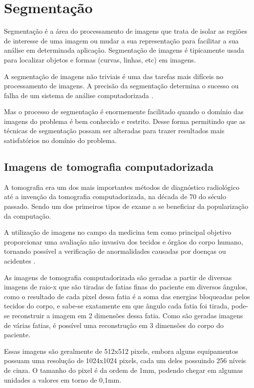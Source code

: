 \chapter{Segmentação}

Segmentação é a área do processamento de imagens que trata de isolar as regiões de interesse de uma imagem ou mudar a sua representação para facilitar a sua análise em determinada aplicação. Segmentação de imagens é tipicamente usada para localizar objetos e formas (curvas, linhas, etc) em imagens.

A segmentação de imagens não triviais é uma das tarefas mais difíceis no processamento de imagens. A precisão da segmentação determina o sucesso ou falha de um sistema de análise computadorizada \cite{gonzalez}.

Mas o processo de segmentação é enormemente facilitado quando o domínio das imagens do problema é bem conhecido e restrito. Desse forma permitindo que as técnicas de segmentação possam ser alteradas para trazer resultados mais satisfatórios no domínio do problema.

\section{Imagens de tomografia computadorizada}

A tomografia era um dos mais importantes métodos de diagnóstico radiológico até a invenção da tomografia computadorizada, na década de 70 do século passado. Sendo um dos primeiros tipos de exame a se beneficiar da popularização da computação.

A utilização de imagens no campo da medicina tem como principal objetivo proporcionar uma avaliação não invasiva dos tecidos e órgãos do corpo humano, tornando possível a verificação de anormalidades causadas por doenças ou
acidentes \cite{oliveira}.

As imagens de tomografia computadorizada são geradas a partir de diversas imagens de raio-x que são tiradas de fatias finas do paciente em diversos ângulos, como o resultado de cada pixel dessa fatia é a soma das energias bloqueadas pelos tecidos do corpo, e sabe-se exatamente em que ângulo cada fatia foi tirada, pode-se reconstruir a imagem em 2 dimensões dessa fatia. Como são geradas imagens de várias fatias, é possível uma reconstrução em 3 dimensões do corpo do paciente.


Essas imagens são geralmente de 512x512 pixels, embora alguns equipamentos possuam uma resolução de 1024x1024 pixels, cada um deles possuindo 256 níveis de cinza. O tamanho do pixel é da ordem de 1mm, podendo chegar em algumas unidades a valores em torno de 0,1mm.


